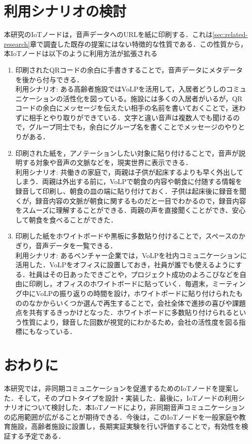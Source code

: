\documentclass[submit,techrep,noauthor]{ipsj}
\begin{document}
\section{利用シナリオの検討}
本研究のIoTノードは，音声データへのURLを紙に印刷する．これは\ref{sec:related-research}章で調査した既存の提案にはない特徴的な性質である．この性質から，本IoTノードは以下のように利用方法が拡張される
\begin{enumerate}
    \item 印刷されたQRコードの余白に手書きすることで，音声データにメタデータを後から付与できる．\\利用シナリオ: ある高齢者施設ではVoLPを活用して，入居者どうしのコミュニケーションの活性化を図っている。施設には多くの入居者がいるが，QRコードの余白にメッセージを伝えたい相手の名前を書いておくことで，迷わずに相手とやり取りができている．文字と違い音声は複数人でも聞けるので，グループ同士でも，余白にグループ名を書くことでメッセージのやりとりがある．
    \item 印刷された紙を，アノテーションしたい対象に貼り付けることで，音声が説明する対象や音声の文脈などを，現実世界に表示できる．\\利用シナリオ: 共働きの家庭で，両親は子供が起床するよりも早く外出してしまう．両親は外出する前に，VoLPで朝食の内容や朝食に付随する情報を録音して印刷し、朝食の皿の端に貼り付けておく．子供は起床後に録音を聞くが，録音内容の文脈が朝食に関するものだと一目でわかるので，録音内容をスムーズに理解することができる．両親の声を直接聞くことができ、安心して朝食を食べることができた．
    \item 印刷した紙をホワイトボードや黒板に多数貼り付けることで，スペースのかぎり，音声データを一覧できる．\\利用シナリオ: あるベンチャー企業では，VoLPを社内コミュニケーションに活用した．VoLPをオフィスに設置しておき，社員が誰でも使えるようにする．社員はその日あったできごとや，プロジェクト成功のよろこびなどを自由に印刷し，オフィスのホワイトボードに貼っていく．毎週末，ミーティング中にVoLPの振り返りの時間を設け，ホワイトボードに貼り付けられたもののなかからいくつか選んで再生することで，会社全体で進捗の喜びや課題点を共有するきっかけとなった．ホワイトボードに多数貼り付けられるという性質により，録音した回数が視覚的にわかるため，会社の活性度を図る指標にもなっている．
\end{enumerate}

\section{おわりに}
本研究では，非同期コミュニケーションを促進するためのIoTノードを提案した．そして，そのプロトタイプを設計・実装した．最後に，IoTノードの利用シナリオについて検討した．本IoTノードにより，非同期音声コミュニケーションの応用範囲が広がることが期待できる．今後は，このIoTノードを一般家庭や教育施設，高齢者施設に設置し，長期実証実験を行い評価することで，有効性を検証する予定である．



 
\end{document}
